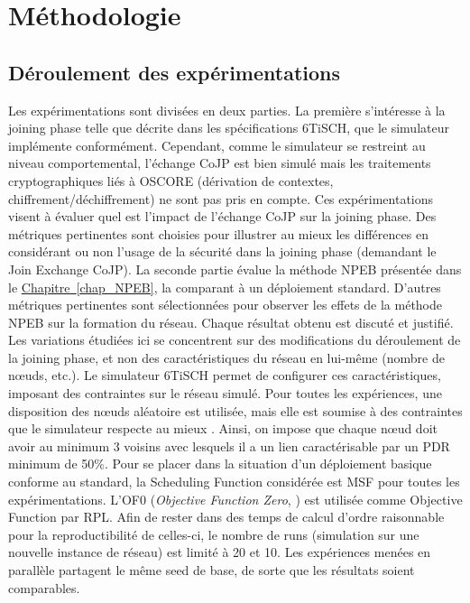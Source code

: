 \documentclass[]{report}
\newcommand{\wordlink}[2]{\hyperref[#2]{#1~\ref{#2}}}
\begin{document}
\section{Méthodologie}

\subsection{Déroulement des expérimentations}

Les expérimentations sont divisées en deux parties. La première s'intéresse à la joining phase telle que décrite dans les spécifications 6TiSCH, que le simulateur implémente conformément. Cependant, comme le simulateur se restreint au niveau comportemental, l'échange CoJP est bien simulé mais les traitements cryptographiques liés à OSCORE (dérivation de contextes, chiffrement/déchiffrement) ne sont pas pris en compte. Ces expérimentations visent à évaluer quel est l'impact de l'échange CoJP sur la joining phase. Des métriques pertinentes sont choisies pour illustrer au mieux les différences en considérant ou non l'usage de la sécurité dans la joining phase (demandant le Join Exchange CoJP). La seconde partie évalue la méthode NPEB présentée dans le \wordlink{Chapitre}{chap_NPEB}, la comparant à un déploiement standard. D'autres métriques pertinentes sont sélectionnées pour observer les effets de la méthode NPEB sur la formation du réseau. Chaque résultat obtenu est discuté et justifié.\\

Les variations étudiées ici se concentrent sur des modifications du déroulement de la joining phase, et non des caractéristiques du réseau en lui-même (nombre de nœuds, etc.). Le simulateur 6TiSCH permet de configurer ces caractéristiques, imposant des contraintes sur le réseau simulé. Pour toutes les expériences, une disposition des nœuds aléatoire est utilisée, mais elle est soumise à des contraintes que le simulateur respecte au mieux \cite{simulating-6TiSCH}. Ainsi, on impose que chaque nœud doit avoir au minimum 3 voisins avec lesquels il a un lien caractérisable par un PDR minimum de 50\%. Pour se placer dans la situation d'un déploiement basique conforme au standard, la Scheduling Function considérée est MSF pour toutes les expérimentations. L'OF0 (\textit{Objective Function Zero}, \cite{rfc6552}) est utilisée comme Objective Function par RPL. Afin de rester dans des temps de calcul d'ordre raisonnable pour la reproductibilité de celles-ci, le nombre de runs (simulation sur une nouvelle instance de réseau) est limité à 20 et 10. Les expériences menées en parallèle partagent le même seed de base, de sorte que les résultats soient comparables.\\
\end{document}

